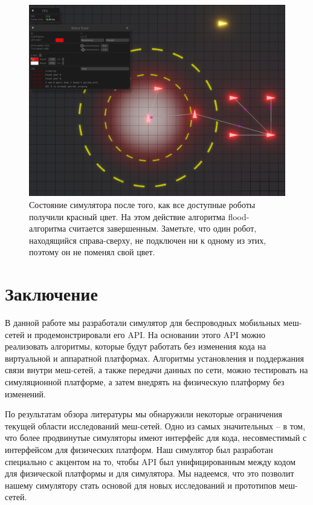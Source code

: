 \documentclass[%
]{report}
\begin{document}
\begin{figure}
  \includegraphics[width = \textwidth]{colors-4.png}
  \caption{Состояние симулятора после того, как все доступные роботы получили красный цвет. На этом действие алгоритма flood-алгоритма
  считается завершенным. Заметьте, что один робот,
  находящийся справа-сверху, не подключен ни к одному из этих, поэтому он не поменял свой цвет.}
\end{figure}


\chapter*{Заключение}

В данной работе мы разработали симулятор для беспроводных мобильных меш-сетей
и продемонстрировали его API.
На основании этого API можно реализовать алгоритмы, которые будут
работать без изменения кода на виртуальной и аппаратной платформах.
Алгоритмы установления и поддержания связи внутри меш-сетей,
а также передачи данных по сети,
можно тестировать на симуляционной платформе,
а затем внедрять на физическую платформу без изменений.

По результатам обзора литературы мы обнаружили
некоторые ограничения текущей области исследований меш-сетей.
Одно из самых значительных --
в том, что более продвинутые симуляторы имеют интерфейс для кода,
несовместимый с интерфейсом для физических платформ.
Наш симулятор был разработан специально с акцентом на то,
чтобы API был унифицированным между кодом для физической платформы и для симулятора.
Мы надеемся, что это позволит нашему симулятору
стать основой для новых исследований
и прототипов меш-сетей.
\end{document}
